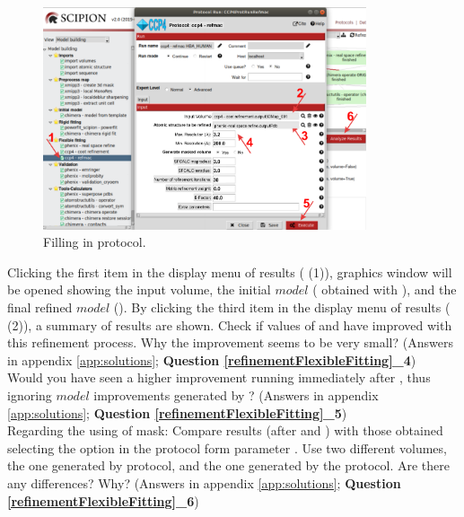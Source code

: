   \begin{figure}[H]
  \centering 
  \captionsetup{width=.7\linewidth} 
  \includegraphics[width=0.85\textwidth]{Images/Fig31}
  \caption{Filling in  protocol.}
  \label{fig:refmac_protocol}
  \end{figure}
  Clicking the first item in the display menu of results ( (1)), \chimera graphics window will be opened showing the input volume, the initial $model$ ( obtained with \phenix {}), and the final  refined $model$ (). By clicking the third item in the display menu of results ( (2)), a summary of  results are shown. Check if values of  and  have improved with this refinement process. Why the improvement seems to be very small? (Answers in appendix \ref{app:solutions}; \textbf{Question \ref{refinementFlexibleFitting}\_4})\\
  
  Would you have seen a higher improvement running  immediately after \coot, thus ignoring $model$ improvements generated by \phenix {}? (Answers in appendix \ref{app:solutions}; \textbf{Question \ref{refinementFlexibleFitting}\_5})\\
  
  Regarding the using of mask: Compare  results (after \coot and \phenix {}) with those obtained selecting the option  in the protocol form parameter . Use two different volumes, the one generated by \coot protocol, and the one generated by the  protocol. Are there any differences? Why? (Answers in appendix \ref{app:solutions}; \textbf{Question \ref{refinementFlexibleFitting}\_6})\\
  
